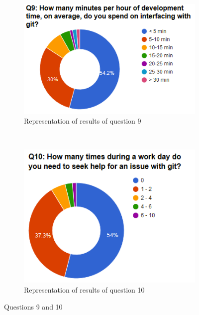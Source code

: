 \documentclass[a4paper,oneside]{bth} %
\begin{document}
		\begin{figure}[H]
			\centering
			\begin{subfigure}[b]{0.45\textwidth}
				\includegraphics[width=\textwidth]{graphs/q9.png}
				\caption{Representation of results of question 9}
				\label{fig:q9}
			\end{subfigure}
			~
			\begin{subfigure}[b]{0.45\textwidth}
				\includegraphics[width=\textwidth]{graphs/q10.png}
				\caption{Representation of results of question 10}
				\label{fig:q10}
			\end{subfigure}
			\caption{Questions 9 and 10}\label{fig:q9-q10}
		\end{figure}
\end{document}
